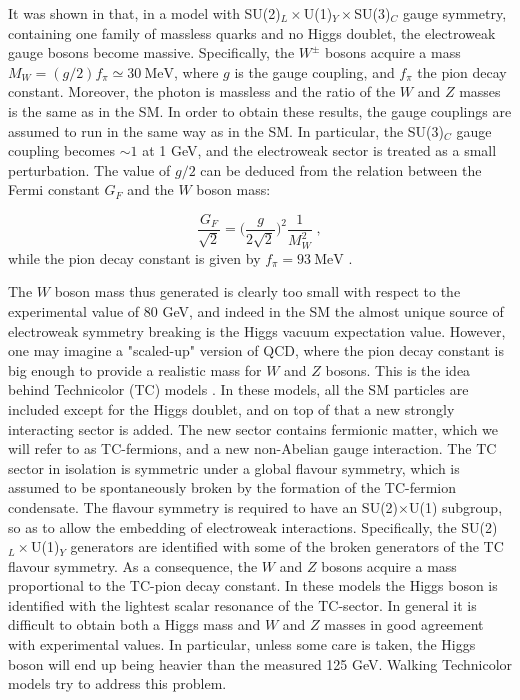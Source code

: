 It was shown in \cite{Susskind:1978ms} that, in a model with SU(2)$_L\times$U(1)$_Y\times$SU(3)$_C$ gauge symmetry, containing one family of massless quarks and no Higgs doublet, the electroweak gauge bosons become massive.
Specifically, the $W^{\pm}$ bosons acquire a mass $M_{W} = (g/2) f_{\pi} \simeq 30 \: \mathrm{MeV}$, where $g$ is the \suEW gauge coupling, and $f_{\pi}$ the pion decay constant. Moreover, the photon is massless and the ratio of the $W$ and $Z$ masses is the same as in the SM. In order to obtain these results, the gauge couplings are assumed to run in the same way as in the SM. In particular, the SU(3)$_C$ gauge coupling becomes $\sim 1$ at 1 GeV, and the electroweak sector is treated as a small perturbation. The value of $g/2$ can be deduced from the relation between the Fermi constant $G_F$ and the $W$ boson mass:

\begin{equation}
\frac{G_F}{\sqrt 2} = \biggl( \frac{g}{2 \sqrt 2} \biggr)^2 \frac{1}{M_W^2}  \; ,
\end{equation} 
%
while the pion decay constant is given by $f_{\pi} = 93 \: \mathrm{MeV}$ \cite{Peskin:1995ev}.

The $W$ boson mass thus generated is clearly too small with respect to the experimental value of 80 GeV, and indeed in the SM the almost unique source of electroweak symmetry breaking is the Higgs vacuum expectation value. However, one may imagine a "scaled-up" version of QCD, where the pion decay constant is big enough to provide a realistic mass for $W$ and $Z$ bosons. This is the idea behind Technicolor (TC) models \cite{Weinberg:1975gm,Susskind:1978ms}. 
In these models, all the SM particles are included except for the Higgs doublet, and on top of that a new strongly interacting sector is added. The new sector contains fermionic matter, which we will refer to as TC-fermions, and a new non-Abelian gauge interaction. 
The TC sector in isolation is symmetric under a global flavour symmetry, which is assumed to be spontaneously broken by the formation of the TC-fermion condensate. 
The flavour symmetry is required to have an SU(2)$\times$U(1) subgroup, so as to allow the embedding of electroweak interactions. Specifically, the SU(2)$_L\times$U(1)$_Y$ generators are identified with some of the broken generators of the TC flavour symmetry. As a consequence, the $W$ and $Z$ bosons acquire a mass proportional to the TC-pion decay constant. 
In these models the Higgs boson is identified with the lightest scalar resonance of the TC-sector. In general it is difficult to obtain both a Higgs mass and $W$ and $Z$ masses in good agreement with experimental values. In particular, unless some care is taken, the Higgs boson will end up being heavier than the measured 125 GeV. Walking Technicolor models \cite{Holdom:1981rm,Yamawaki:1985zg,Dietrich:2005jn,Appelquist:2010gy} try to address this problem.

